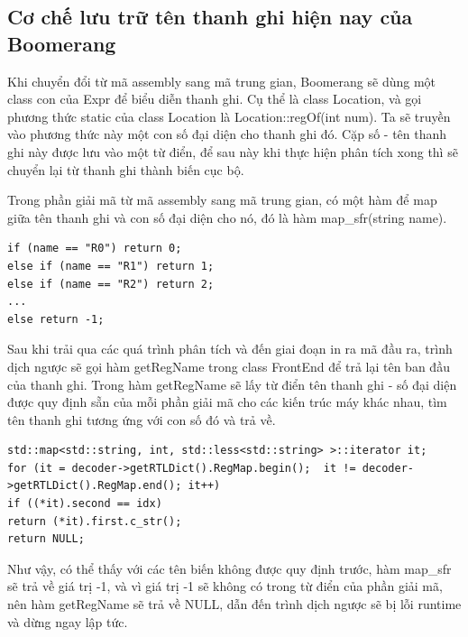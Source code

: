 \subsection{Cơ chế lưu trữ tên thanh ghi hiện nay của Boomerang}
Khi chuyển đổi từ mã assembly sang mã trung gian, Boomerang sẽ dùng một class con của Expr để biểu diễn thanh ghi. Cụ thể là class Location, và gọi phương thức static của class Location là Location::regOf(int num). Ta sẽ truyền vào phương thức này một con số đại diện cho thanh ghi đó. Cặp số - tên thanh ghi này được lưu vào một từ điển, để sau này khi thực hiện phân tích xong thì sẽ chuyển lại từ thanh ghi thành biến cục bộ.

Trong phần giải mã từ mã assembly sang mã trung gian, có một hàm để map giữa tên thanh ghi và con số đại diện cho nó, đó là hàm map\_sfr(string name).
\begin{lstlisting}[caption={Một số phần mã trong hàm map\_sfr},label={list:listmapsfr}]
if (name == "R0") return 0;
else if (name == "R1") return 1;
else if (name == "R2") return 2;
...
else return -1;

\end{lstlisting}

Sau khi trải qua các quá trình phân tích và đến giai đoạn in ra mã đầu ra, trình dịch ngược sẽ gọi hàm getRegName trong class FrontEnd để trả lại tên ban đầu của thanh ghi. Trong hàm getRegName sẽ lấy từ điển tên thanh ghi - số đại diện được quy định sẵn của mỗi phần giải mã cho các kiến trúc máy khác nhau, tìm tên thanh ghi tương ứng với con số đó và trả về.
\begin{lstlisting}[caption={Phần mã trong hàm getRegName},label={list:listgetregname}]
std::map<std::string, int, std::less<std::string> >::iterator it;
for (it = decoder->getRTLDict().RegMap.begin();	 it != decoder->getRTLDict().RegMap.end(); it++)
if ((*it).second == idx) 
return (*it).first.c_str();
return NULL;
\end{lstlisting}


Như vậy, có thể thấy với các tên biến không được quy định trước, hàm map\_sfr sẽ trả về giá trị -1, và vì giá trị -1 sẽ không có trong từ điển của phần giải mã, nên hàm getRegName sẽ trả về NULL, dẫn đến trình dịch ngược sẽ bị lỗi runtime và dừng ngay lập tức.\\



